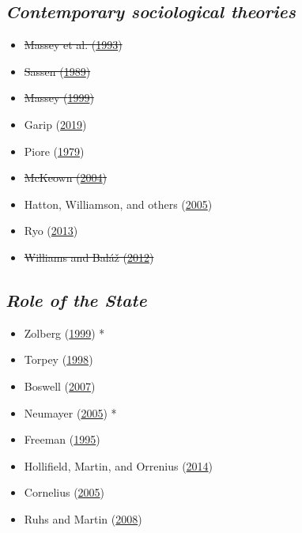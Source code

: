 \documentclass[
]{article}
\providecommand{\tightlist}{%
  \setlength{\itemsep}{0pt}\setlength{\parskip}{0pt}}
\begin{document}
\hypertarget{contemporary-sociological-theories}{%
\subsection{\texorpdfstring{\emph{Contemporary sociological
theories}}{Contemporary sociological theories}}\label{contemporary-sociological-theories}}

\begin{itemize}
\tightlist
\item
  \sout{Massey et al.
  (\protect\hyperlink{ref-massey1993theories}{1993})}
\item
  \sout{Sassen (\protect\hyperlink{ref-sassen1989america}{1989})}
\item
  \sout{Massey (\protect\hyperlink{ref-massey1999why}{1999})}
\item
  Garip (\protect\hyperlink{ref-garip2019move}{2019})
\item
  Piore (\protect\hyperlink{ref-piore1979birds}{1979})
\item
  \sout{McKeown (\protect\hyperlink{ref-mckeown2004global}{2004})}
\item
  Hatton, Williamson, and others
  (\protect\hyperlink{ref-hatton2005global}{2005})
\item
  Ryo (\protect\hyperlink{ref-ryo2013deciding}{2013})
\item
  \sout{Williams and Baláž
  (\protect\hyperlink{ref-williams2012migration}{2012})}
\end{itemize}

\hypertarget{role-of-the-state}{%
\subsection{\texorpdfstring{\emph{Role of the
State}}{Role of the State}}\label{role-of-the-state}}

\begin{itemize}
\tightlist
\item
  Zolberg (\protect\hyperlink{ref-zolberg1999matters}{1999}) *
\item
  Torpey (\protect\hyperlink{ref-torpey1998coming}{1998})
\item
  Boswell (\protect\hyperlink{ref-boswell2007theorizing}{2007})
\item
  Neumayer (\protect\hyperlink{ref-neumayer2005bogus}{2005}) *
\item
  Freeman (\protect\hyperlink{ref-freeman1995modes}{1995})
\item
  Hollifield, Martin, and Orrenius
  (\protect\hyperlink{ref-hollifield2014dilemmas}{2014})
\item
  Cornelius (\protect\hyperlink{ref-cornelius2005controlling}{2005})
\item
  Ruhs and Martin (\protect\hyperlink{ref-ruhs2008numbers}{2008})
\end{itemize}
\end{document}
